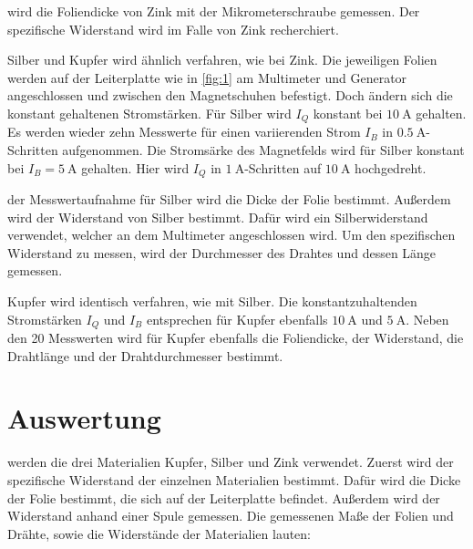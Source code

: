 \justifying wird die Foliendicke von Zink mit der Mikrometerschraube gemessen. Der spezifische Widerstand wird im 
Falle von Zink recherchiert. 

\justifying Silber und Kupfer wird ähnlich verfahren, wie bei Zink. Die jeweiligen Folien werden auf der Leiterplatte wie in
\ref{fig:1} am Multimeter und Generator angeschlossen und zwischen den Magnetschuhen befestigt. Doch ändern sich die konstant gehaltenen 
Stromstärken. Für Silber wird $I_Q$ konstant bei $\SI{10}{\ampere}$ gehalten. Es werden wieder zehn Messwerte für einen variierenden Strom $I_B$ in 
$\SI{0.5}{\ampere}$-Schritten aufgenommen. Die Stromsärke des Magnetfelds wird für Silber konstant bei $I_B = \SI{5}{\ampere}$ gehalten. Hier
wird $I_Q$ in $\SI{1}{\ampere}$-Schritten auf $\SI{10}{\ampere}$ hochgedreht. 

\justifying der Messwertaufnahme für Silber wird die Dicke der Folie bestimmt. Außerdem wird der Widerstand von Silber bestimmt.
Dafür wird ein Silberwiderstand verwendet, welcher an dem Multimeter angeschlossen wird. Um den spezifischen Widerstand zu messen, wird der 
Durchmesser des Drahtes und dessen Länge gemessen. 

\justifying Kupfer wird identisch verfahren, wie mit Silber. Die konstantzuhaltenden Stromstärken $I_Q$ und $I_B$ entsprechen für
Kupfer ebenfalls $\SI{10}{\ampere}$ und $\SI{5}{\ampere}$. Neben den 20 Messwerten wird für Kupfer ebenfalls die Foliendicke, der Widerstand, die 
Drahtlänge und der Drahtdurchmesser bestimmt. 

\section{Auswertung} \label{sec:5}

\justifying werden die drei Materialien Kupfer, Silber und Zink verwendet. Zuerst wird der spezifische Widerstand der einzelnen
Materialien bestimmt. Dafür wird die Dicke der Folie bestimmt, die sich auf der Leiterplatte befindet. Außerdem wird der Widerstand anhand einer 
Spule gemessen. Die gemessenen Maße der Folien und Drähte, sowie die Widerstände der Materialien lauten:

